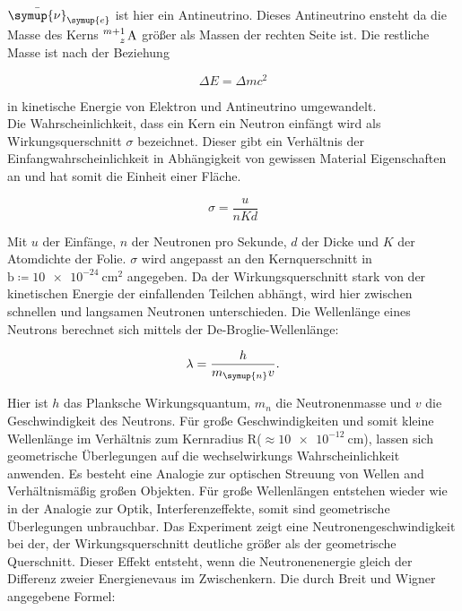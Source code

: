 \noindent $\bar{\symup{\nu}}_{\symup{e}}$ ist hier ein Antineutrino. Dieses Antineutrino ensteht da die Masse des Kerns $\ce{^{m+1}_z \text{A}}$ 
größer als Massen der rechten Seite ist. Die restliche Masse ist nach der Beziehung

\begin{equation*}
   \Delta E = \Delta m c^2 \nonumber
\end{equation*}

\noindent in kinetische Energie von Elektron und Antineutrino umgewandelt.\\
Die Wahrscheinlichkeit, dass ein Kern ein Neutron einfängt wird als Wirkungsquerschnitt $\sigma$ bezeichnet. Dieser gibt ein Verhältnis der 
Einfangwahrscheinlichkeit in Abhängigkeit von gewissen Material Eigenschaften an und hat somit die Einheit einer Fläche.

\begin{equation*}
   \sigma = \frac{u}{nKd} \nonumber
\end{equation*}

\noindent Mit $u$ der Einfänge, $n$ der Neutronen pro Sekunde, $d$ der Dicke und $K$ der Atomdichte der Folie. $\sigma$ wird angepasst an den 
Kernquerschnitt in $\si{\barn} \coloneqq \SI{10e-24}{\centi\metre\squared}$ angegeben. Da der Wirkungsquerschnitt stark von der kinetischen Energie 
der einfallenden Teilchen abhängt, wird hier zwischen schnellen und langsamen Neutronen unterschieden. Die Wellenlänge eines Neutrons 
berechnet sich mittels der De-Broglie-Wellenlänge:

\begin{equation*}
   \lambda = \frac{h}{m_{\symup{n}}v}. \nonumber
\end{equation*}

\noindent Hier ist $h$ das Planksche Wirkungsquantum, $m_n$ die Neutronenmasse und $v$ die Geschwindigkeit des Neutrons. Für große Geschwindigkeiten 
und somit kleine Wellenlänge im Verhältnis zum Kernradius R($\approx \SI{10e-12}{\centi\meter}$), lassen sich geometrische Überlegungen auf die 
wechselwirkungs Wahrscheinlichkeit anwenden. Es besteht eine Analogie zur optischen Streuung von Wellen and Verhältnismäßig großen Objekten. ­Für 
große Wellenlängen entstehen wieder wie in der Analogie zur Optik, Interferenzeffekte, somit sind geometrische Überlegungen unbrauchbar. Das 
Experiment zeigt eine Neutronengeschwindigkeit bei der, der Wirkungsquerschnitt deutliche größer als der geometrische Querschnitt. Dieser Effekt
entsteht, wenn die Neutronenenergie gleich der Differenz zweier Energienevaus im Zwischenkern. Die durch Breit und Wigner angegebene Formel:


